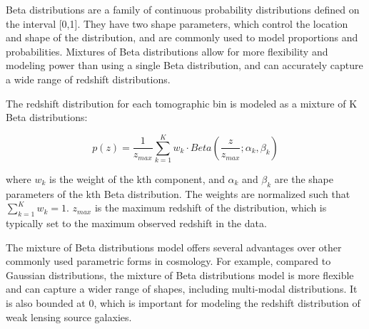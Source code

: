 \documentclass[twocolumn,draft]{aastex631}
\begin{document}
Beta distributions are a family of continuous probability distributions defined on the interval [0,1]. They have two shape parameters, which control the location and shape of the distribution, and are commonly used to model proportions and probabilities. Mixtures of Beta distributions allow for more flexibility and modeling power than using a single Beta distribution, and can accurately capture a wide range of redshift distributions.

The redshift distribution for each tomographic bin is modeled as a mixture of K Beta distributions:

\begin{equation}
p(z) = \frac{1}{z_{max}} \sum_{k=1}^{K} w_k \cdot Beta\left(\frac{z}{z_{max}}; \alpha_k, \beta_k\right)
\end{equation}

where $w_k$ is the weight of the kth component, and $\alpha_k$ and $\beta_k$ are the shape parameters of the kth Beta distribution. The weights are normalized such that $\sum_{k=1}^{K} w_k = 1$. $z_{max}$ is the maximum redshift of the distribution, which is typically set to the maximum observed redshift in the data.

The mixture of Beta distributions model offers several advantages over other commonly used parametric forms in cosmology. For example, compared to Gaussian distributions, the mixture of Beta distributions model is more flexible and can capture a wider range of shapes, including multi-modal distributions. It is also bounded at 0, which is important for modeling the redshift distribution of weak lensing source galaxies.



\end{document}
